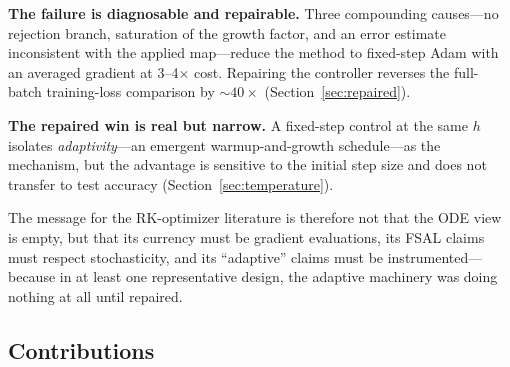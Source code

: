 \documentclass{article}
\begin{document}
\textbf{The failure is diagnosable and repairable.} Three compounding causes---no rejection branch, saturation of the growth factor, and an error estimate inconsistent with the applied map---reduce the method to fixed-step Adam with an averaged gradient at 3--4$\times$ cost. Repairing the controller reverses the full-batch training-loss comparison by ${\sim}40\times$ (Section~\ref{sec:repaired}).

\textbf{The repaired win is real but narrow.} A fixed-step control at the same $h$ isolates \emph{adaptivity}---an emergent warmup-and-growth schedule---as the mechanism, but the advantage is sensitive to the initial step size and does not transfer to test accuracy (Section~\ref{sec:temperature}).

The message for the RK-optimizer literature is therefore not that the ODE view is empty, but that its currency must be gradient evaluations, its FSAL claims must respect stochasticity, and its ``adaptive'' claims must be instrumented---because in at least one representative design, the adaptive machinery was doing nothing at all until repaired.

\subsection{Contributions}
\label{sec:contributions}
\end{document}

